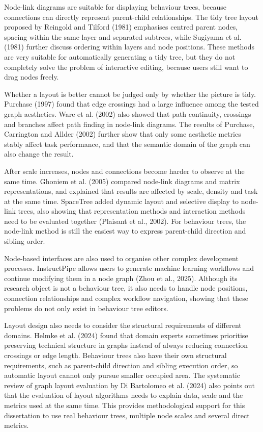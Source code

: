 Node-link diagrams are suitable for displaying behaviour trees, because connections can directly represent parent-child relationships. The tidy tree layout proposed by Reingold and Tilford (1981) emphasises centred parent nodes, spacing within the same layer and separated subtrees, while Sugiyama et al. (1981) further discuss ordering within layers and node positions. These methods are very suitable for automatically generating a tidy tree, but they do not completely solve the problem of interactive editing, because users still want to drag nodes freely.

Whether a layout is better cannot be judged only by whether the picture is tidy. Purchase (1997) found that edge crossings had a large influence among the tested graph aesthetics. Ware et al. (2002) also showed that path continuity, crossings and branches affect path finding in node-link diagrams. The results of Purchase, Carrington and Allder (2002) further show that only some aesthetic metrics stably affect task performance, and that the semantic domain of the graph can also change the result.

After scale increases, nodes and connections become harder to observe at the same time. Ghoniem et al. (2005) compared node-link diagrams and matrix representations, and explained that results are affected by scale, density and task at the same time. SpaceTree added dynamic layout and selective display to node-link trees, also showing that representation methods and interaction methods need to be evaluated together (Plaisant et al., 2002). For behaviour trees, the node-link method is still the easiest way to express parent-child direction and sibling order.

Node-based interfaces are also used to organise other complex development processes. InstructPipe allows users to generate machine learning workflows and continue modifying them in a node graph (Zhou et al., 2025). Although its research object is not a behaviour tree, it also needs to handle node positions, connection relationships and complex workflow navigation, showing that these problems do not only exist in behaviour tree editors.

Layout design also needs to consider the structural requirements of different domains. Helmke et al. (2024) found that domain experts sometimes prioritise preserving technical structure in graphs instead of always reducing connection crossings or edge length. Behaviour trees also have their own structural requirements, such as parent-child direction and sibling execution order, so automatic layout cannot only pursue smaller occupied area. The systematic review of graph layout evaluation by Di Bartolomeo et al. (2024) also points out that the evaluation of layout algorithms needs to explain data, scale and the metrics used at the same time. This provides methodological support for this dissertation to use real behaviour trees, multiple node scales and several direct metrics.

